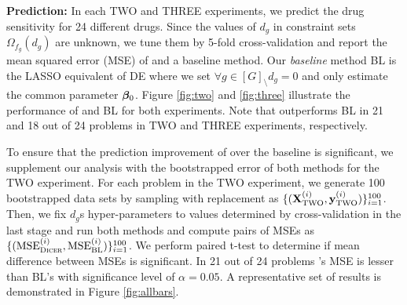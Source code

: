 
{\bf Prediction:} In each TWO and THREE experiments, we predict the drug sensitivity for 24 different drugs.  %
Since the values of $d_g$  in constraint sets $\Omega_{f_g}(d_g)$  are unknown, we tune them by 5-fold cross-validation and report the mean squared error (MSE) of \dc{} and a baseline method. 
Our \emph{baseline} method BL is the LASSO \cite{tibs96} equivalent of DE where we set $\forall g \in [G]_\setminus d_g = 0$ and only estimate the common parameter $\boldsymbol{\beta}_0$. 
Figure \ref{fig:two} and \ref{fig:three} illustrate the performance of \dc{} and BL for both experiments. 
Note that \dc{} outperforms BL in 21 and 18 out of 24 problems in TWO and THREE experiments, respectively.

To ensure that the prediction improvement of \dc{} over the baseline is significant, we supplement our analysis with the bootstrapped error of both methods for the TWO experiment.
For each problem in the TWO experiment, we generate 100 bootstrapped data sets by sampling with replacement as $\{(\mathbf{X}^{(i)}_{\text{TWO}}, \mathbf{y}^{(i)}_{\text{TWO}})\}_{i=1}^{100}$.  
Then, we fix $d_g$s hyper-parameters to values determined by cross-validation in the last stage and run both methods and compute pairs of MSEs as $\{(\text{MSE}^{(i)}_{\text{{\sc Dicer}}}, \text{MSE}^{(i)}_{\text{BL}})\}_{i=1}^{100}$. We perform paired t-test to determine if mean difference between MSEs is significant. In 21 out of 24 problems \dc's MSE is lesser than BL's with significance level of $\alpha = 0.05$. A representative set of results is demonstrated in Figure \ref{fig:allbars}. 

	





